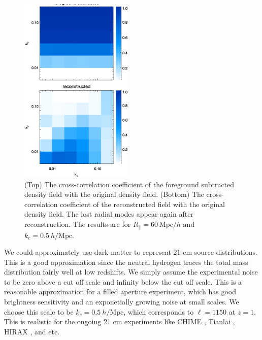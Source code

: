 \documentclass[aps,prl,twocolumn,showpacs,superscriptaddress,groupedaddress,nofootinbib,floatfix]{revtex4}  %
\newcommand{\mr}{\mathrm}
\begin{document}
\begin{figure}[tbp]
\begin{center}
\includegraphics[width=0.48\textwidth]{1.000cc2d.eps}
\end{center}
\vspace{-0.7cm}
\caption{(Top) The cross-correlation coefficient of the  
foreground subtracted density field with the original density field.
(Bottom) The cross-correlation coefficient of the reconstructed field with 
the original density field. 
The lost radial modes appear again after reconstruction.
The results are for $R_\parallel=60\ \mr{Mpc}/h$ and $k_c=0.5\ h/\mr{Mpc}$.}
\label{fig:ratio}
\end{figure}

We could approximately use dark matter to represent 21 cm source distributions.
This is a good approximation since the neutral hydrogen traces the total mass
distribution fairly well at low redshifts. We simply assume the experimental
noise to be zero above a cut off scale and infinity below the cut off scale.
This is a reasonable approximation for a filled aperture experiment, which
has good brightness sensitivity and an exponetially growing noise at small 
scales.
We choose this scale to be $k_c=0.5\ h/\mr{Mpc}$, which corresponds to 
$\ell=1150$ at $z=1$. This is realistic for the ongoing 21 cm experiments like
CHIME \cite{2014SPIE.9145E..22B}, Tianlai \cite{2015ApJ...798...40X}, 
HIRAX \cite{HIRAX}, and etc.
\end{document}
